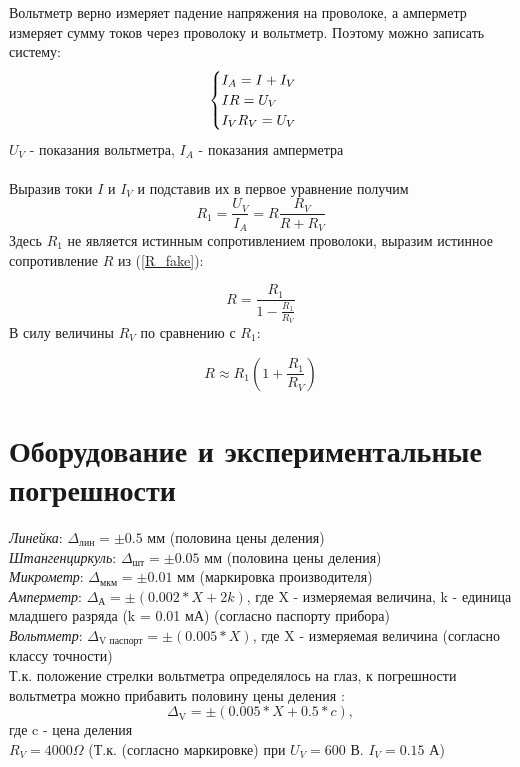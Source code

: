 \documentclass{article}
\begin{document}
	Вольтметр верно измеряет падение напряжения на проволоке, а амперметр измеряет сумму токов через проволоку и вольтметр. Поэтому можно записать систему:\\
	\begin{equation}
		\begin{cases}
			$$ I_{A} = I + I_{V} $$\\
			$$IR = U_{V} $$\\
			$$I_{V}R_{V} = U_{V} $$
		\end{cases} 
	\end{equation}
	$U_{V}$ - показания вольтметра, $I_{A}$ - показания амперметра\\\\
	Выразив токи $I$ и $I_{V}$ и подставив их в первое уравнение получим\\
	\begin{equation}
		\label{R_fake}
		R_{\text{1}} = \frac{U_{V}}{I_{A}}= R\frac{R_{V}}{R+R_{V}}
	\end{equation}
	Здесь $R_{1}$ не является истинным сопротивлением проволоки, выразим истинное сопротивление $R$ из (\ref{R_fake}):
	
	$$R = \frac{R_{1}}{1 - \frac{R_{1}}{R_{V}}}$$
	В силу величины $R_{V}$ по сравнению с $R_{1}$:
	
	\begin{equation}
		R \approx R_{1}(1 + \frac{R_{1}}{R_{V}})
	\end{equation}
	
	
	
	\section{Оборудование и экспериментальные погрешности}
	
	\emph{Линейка}: $\Delta_{\text{лин}} = \pm 0.5$ мм (половина цены деления)\\
	\emph{Штангенциркуль}: $\Delta_{\text{шт}} = \pm 0.05$ мм (половина цены деления)\\
	\emph{Микрометр}: $\Delta_{\text{мкм}} = \pm 0.01$ мм (маркировка производителя)\\
	\emph{Амперметр}: $\Delta_{\text{А}} = \pm (0.002 * X + 2k)$, где X - измеряемая величина, k - единица младшего разряда (k = 0.01 мА) (согласно паспорту прибора)\\
	\emph{Вольтметр}: $\Delta_{\text{V паспорт}} = \pm (0.005 * X)$, где X - измеряемая величина (согласно классу точности)\\
	Т.к. положение стрелки вольтметра определялось на глаз, к погрешности вольтметра можно прибавить половину цены деления :\\
	$$\Delta_{\text{V}} = \pm (0.005 * X + 0.5 * c),$$ где c - цена деления\\
	$R_{V} = 4000 \Omega $ (Т.к. (согласно маркировке) при $U_{V} = 600$ В. $I_{V} = 0.15$ А)\\
\end{document}
